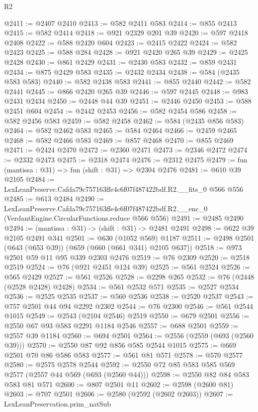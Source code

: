\begin{lexlean}{R2}
\begin{coremodule}
@2411 := @2407 @2410
@2413 := @582 @2411 @583
@2414 := @855 @2413
@2415 := @582 @2414
@2418 := @921 @2329 @201 @39
@2420 := @597 @2418 @2408
@2422 := @588 @2420 @604
@2423 := @2415 @2422
@2424 := @582 @2423
@2425 := @588 @284
@2428 := @921 @2420 @265 @39
@2429 := @2425 @2428
@2430 := @861 @2429
@2431 := @2430 @583
@2432 := @859 @2431
@2434 := @875 @2429 @583
@2435 := @2432 @2434
@2438 := @584 (@2435 @583 @583)
@2440 := @582 @2438 @583
@2441 := @855 @2440
@2442 := @582 @2441
@2445 := @866 @2420 @265 @39
@2446 := @597 @2445
@2448 := @983 @2431 @2434
@2450 := @2448 @44 @39
@2451 := @2446 @2450
@2453 := @588 @2451 @604
@2454 := @2442 @2453
@2456 := @582 @2454 @586
@2458 := @582 @2456 @583
@2459 := @582 @2458
@2462 := @584 (@2435 @856 @583)
@2464 := @582 @2462 @583
@2465 := @584 @2464
@2466 := @2459 @2465
@2468 := @582 @2466 @583
@2469 := @857 @2468
@2470 := @855 @2469
@2471 := @2424 @2470
@2472 := @2360 @2471
@2473 := @2346 @2472
@2474 := @2332 @2473
@2475 := @2318 @2474
@2476 := @2312 @2475
@2479 := fun (mantissa : @31) => fun (shift : @31) => @2304 @2476
@2481 := @610 @39 @2105
@2484 := LexLeanPreserve.Cafda79c757163ffe4c6f07f487422bdf.R2.__fits_0 @566 @556
@2485 := @613 @2484
@2490 := LexLeanPreserve.Cafda79c757163ffe4c6f07f487422bdf.R2.__enc_0
    (VerdantEngine.CircularFunctions.reduce @566 @556)
@2491 := @2485 @2490
@2494 := (mantissa : @31) -> (shift : @31) -> @2481 @2491
@2498 := @622 @39 @2105 @2491 @341
@2501 := @630 (@1052 @569) @1187
@2511 := @2498 @2501 (@643 (@653 @39)) (@659 (@660 (@661 @341) @2105 @637))
@2518 := @973 @2501 @59 @11 @95 @339 @2303 @2476
@2519 := @76 @2309
@2520 := @2518 @2519
@2524 := @76 (@921 @2451 @124 @39)
@2525 := @561 @2524
@2526 := @565 @2429
@2527 := @561 @2526
@2528 := @2298 @265
@2532 := @76 (@2448 (@2528 @2428) @2428)
@2534 := @561 @2532 @571
@2535 := @2527 @2534
@2536 := @2525 @2535
@2537 := @560 @2536
@2538 := @2520 @2537
@2543 := @757 @2501 @44 @94 @2292 @2302
@2544 := @76 @2300
@2546 := @561 @2544 @1015
@2549 := @2543 (@2104 @2546) @2519
@2550 := @679 @2501
@2556 := @2550 @67 @93 @583 @2291 @1184 @2546
@2557 := @688 @2501
@2559 := @2557 @39 @1184
@2560 := @694 @2501
@2564 := @2556 (@2559 (@693 (@2560 @39)))
@2570 := @2550 @87 @92 @856 @585 @2544 @1015
@2575 := @669 @2501 @70 @86 @586 @583
@2577 := @561 @81 @571
@2578 := @570 @2577
@2580 := @2575 @2578 @2544
@2592 := @2550 @72 @85 @583 @585 @569 @2577 (@2557 @44 @569 (@693 (@2560 @44)))
@2598 := @2550 @82 @84 @583 @583 @81 @571
@2600 := @807 @2501 @11
@2602 := @2598 (@2600 @81)
@2603 := @707 @2501
@2606 := @2580 (@2592 (@2602 @2603))
@2607 := LexLeanPreservation.prim_natSub

\end{coremodule}
\end{lexlean}

